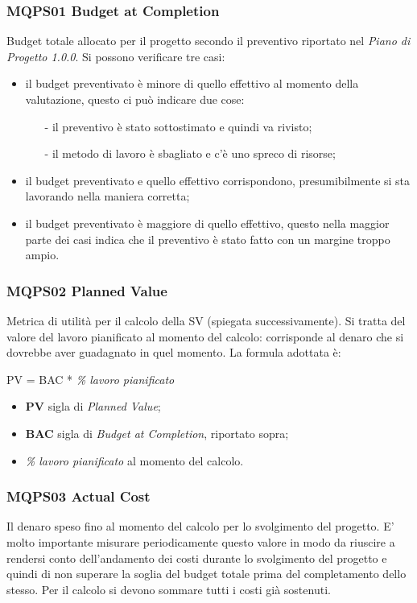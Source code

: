\subsubsection{MQPS01 Budget at Completion}\label{ProcessiOrganizzativiProcessoDiPianificazioneMetricheMQPS01BudgetAtCompletion}
Budget totale allocato per il progetto secondo il preventivo riportato nel \textit{Piano di Progetto 1.0.0}.
Si possono verificare tre casi:
\begin{itemize}
	\item il budget preventivato è minore di quello effettivo al momento della valutazione, questo ci può indicare due cose:
	 \begin{itemize}
	 	\item[-] il preventivo è stato sottostimato e quindi va rivisto;
	 	\item[-] il metodo di lavoro è sbagliato e c’è uno spreco di risorse;
	 \end{itemize}
 	\item il budget preventivato e quello effettivo corrispondono, presumibilmente si sta lavorando nella maniera corretta;
 	\item il budget preventivato è maggiore di quello effettivo, questo nella maggior parte dei casi indica che il preventivo è stato fatto con un margine troppo ampio.
\end{itemize}

\subsubsection{MQPS02 Planned Value}\label{ProcessiOrganizzativiProcessoDiPianificazioneMetricheMQPS02PlannedValue}
Metrica di utilità per il calcolo della SV (spiegata successivamente).
Si tratta del valore del lavoro pianificato al momento del calcolo: corrisponde al denaro che
si dovrebbe aver guadagnato in quel momento.
La formula adottata è:  
	\begin{center}
		PV = BAC * \textit{\% lavoro pianificato}
	\end{center}
\begin{itemize}
	\item \textbf{PV} sigla di \textit{Planned Value};
	\item \textbf{BAC} sigla di \textit{Budget at Completion}, riportato sopra;
	\item \textit{\% lavoro pianificato} al momento del calcolo.
\end{itemize}

\subsubsection{MQPS03 Actual Cost}\label{ProcessiOrganizzativiProcessoDiPianificazioneMetricheMPQS03ActualCost}
Il denaro speso fino al momento del calcolo per lo svolgimento del progetto.
E’ molto importante misurare periodicamente questo valore in modo da riuscire a rendersi conto dell'andamento dei costi durante lo svolgimento del progetto e quindi di non superare la soglia del budget totale prima del completamento dello stesso.
Per il calcolo si devono sommare tutti i costi già sostenuti.

